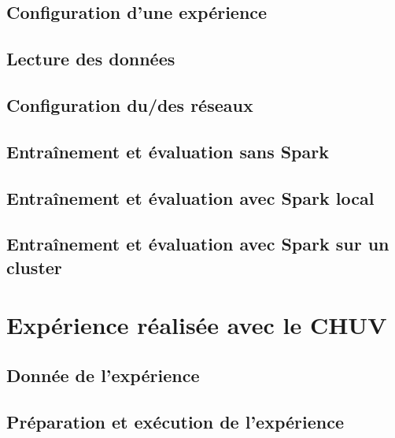 \documentclass[a4paper,10pt,openany,oneside]{sphinxmanual}
\begin{document}
\section{Configuration d'une expérience}
\label{index:configuration-d-une-experience}

\section{Lecture des données}
\label{index:lecture-des-donnees}

\section{Configuration du/des réseaux}
\label{index:configuration-du-des-reseaux}

\section{Entraînement et évaluation sans Spark}
\label{index:entrainement-et-evaluation-sans-spark}

\section{Entraînement et évaluation avec Spark local}
\label{index:entrainement-et-evaluation-avec-spark-local}

\section{Entraînement et évaluation avec Spark sur un cluster}
\label{index:entrainement-et-evaluation-avec-spark-sur-un-cluster}

\chapter{Expérience réalisée avec le CHUV}
\label{index:experience-realisee-avec-le-chuv}

\section{Donnée de l'expérience}
\label{index:donnee-de-l-experience}

\section{Préparation et exécution de l'expérience}
\label{index:preparation-et-execution-de-l-experience}
\end{document}
